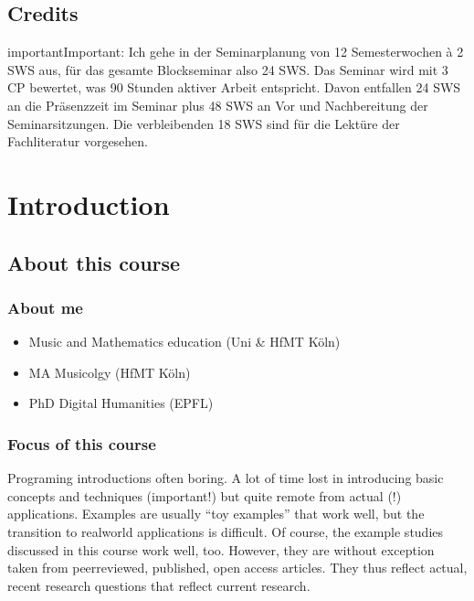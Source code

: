 \documentclass[letterpaper,10pt,english]{sphinxmanual}
\begin{document}
\section{Credits}
\label{\detokenize{1_orga:credits}}
\begin{sphinxadmonition}{important}{Important:}
Ich gehe in der Seminarplanung von 12 Semesterwochen à 2 SWS aus, für das gesamte Blockseminar also 24 SWS.
Das Seminar wird mit 3 CP bewertet, was 90 Stunden aktiver Arbeit entspricht.
Davon entfallen 24 SWS an die Präsenzzeit im Seminar plus 48 SWS an Vor\sphinxhyphen{} und Nachbereitung der Seminarsitzungen.
Die verbleibenden 18 SWS sind für die Lektüre der Fachliteratur vorgesehen.
\end{sphinxadmonition}


\chapter{Introduction}
\label{\detokenize{2_introduction:introduction}}\label{\detokenize{2_introduction::doc}}


\section{About this course}
\label{\detokenize{2_introduction:about-this-course}}

\subsection{About me}
\label{\detokenize{2_introduction:about-me}}\begin{itemize}
\item {} 
Music and Mathematics education (Uni \& HfMT Köln)

\item {} 
MA Musicolgy (HfMT Köln)

\item {} 
PhD Digital Humanities (EPFL)

\end{itemize}


\subsection{Focus of this course}
\label{\detokenize{2_introduction:focus-of-this-course}}
Programing introductions often boring.
A lot of time lost in introducing basic concepts and techniques (important!)
but quite remote from actual (!) applications. Examples are usually “toy examples”
that work well, but the transition to real\sphinxhyphen{}world applications is difficult.
Of course, the example studies discussed in this course work well, too.
However, they are without exception taken from peer\sphinxhyphen{}reviewed, published, open access articles.
They thus reflect actual, recent research questions that reflect current research.
\end{document}
